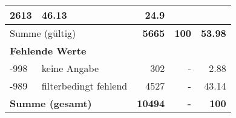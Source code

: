 \begin{longtable}{lXrrr}
       \num{2613} &
       \num[round-mode=places,round-precision=2]{46,13} &
         \num[round-mode=places,round-precision=2]{24,9} \\
     \midrule
     \multicolumn{2}{l}{Summe (gültig)} &
       \textbf{\num{5665}} &
     \textbf{100} &
       \textbf{\num[round-mode=places,round-precision=2]{53,98}} \\
     \multicolumn{5}{l}{\textbf{Fehlende Werte}}\\
       -998 &
       keine Angabe &
         \num{302} &
        - &
         \num[round-mode=places,round-precision=2]{2,88} \\
       -989 &
       filterbedingt fehlend &
         \num{4527} &
        - &
         \num[round-mode=places,round-precision=2]{43,14} \\
     \midrule
     \multicolumn{2}{l}{\textbf{Summe (gesamt)}} &
          \textbf{\num{10494}} &
        \textbf{-} &
        \textbf{100} \\
     \bottomrule
     \end{longtable}
     
